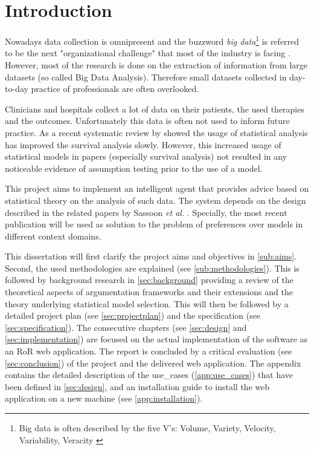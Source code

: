 \section{Introduction}

Nowadays data collection is omnipresent and the buzzword \textit{big data}\footnote{Big data is often described by the five V's: Volume, Variety, Velocity, Variability, Veracity \cite{Hilbert2015}} is referred to be the next "organizational challenge" that most of the industry is facing \cite{bigdata}. However, most of the research is done on the extraction of information from large datasets (so called Big Data Analysis). Therefore small datasets collected in day-to-day practice of professionals are often overlooked. 

Clinicians and hospitals collect a lot of data on their patients, the used therapies and the outcomes. Unfortunately this data is often not used to inform future practice. As a recent systematic review by\cite{survivalAnalysis} showed the usage of statistical analysis has improved the survival analysis slowly. However, this increased usage of statistical models in papers (especially survival analysis) not resulted in any noticeable evidence of assumption testing prior to the use of a model.

This project aims to implement an intelligent agent that provides advice based on statistical theory on the analysis of such data. The system depends on the design described in the related papers by Sassoon \textit{et al.} \cite{sassoon2014,sassoon2016,sassoon2016CD}. Specially, the most recent publication will be used as solution to the problem of preferences over models in different context domains. 


This dissertation will first clarify the project aims and objectives in \autoref{sub:aims}. Second, the used methodologies are explained (see \autoref{sub:methodologies}). This is followed by background research in \autoref{sec:background} providing a review of the theoretical aspects of argumentation frameworks and their extensions and the theory underlying statistical model selection. 
This will then be followed by a detailed project plan (see \autoref{sec:projectplan}) and the specification (see \autoref{sec:specification}). The consecutive chapters (see \autoref{sec:design} and \ref{sec:implementation}) are focused on the actual implementation of the software as an \gls{RoR} web application. 
The report is concluded by a critical evaluation (see \autoref{sec:conclusion}) of the project and the delivered web application. 
The appendix contains the detailed description of the \glspl{use_case} (\autoref{app:use_cases}) that have been defined in \autoref{sec:design}, and an installation guide to install the web application on a new machine (see \autoref{app:installation}).

